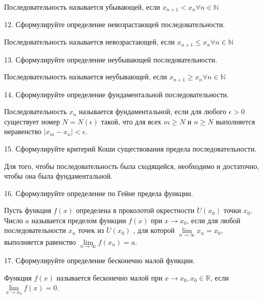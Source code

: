 \documentclass[a4paper, 10pt]{article}
\begin{document}
    Последовательность называется убывающей, если $x_{n+1} < x_n \forall n \in \mathbb{N}$
        
    \begin{bf}12. Сформулируйте определение невозрастающей последовательности.\end{bf}
    
    Последовательность называется невозрастающей, если $x_{n+1} \leqslant x_n \forall n \in \mathbb{N}$
        
    \begin{bf}13. Сформулируйте определение неубывающей последовательности.\end{bf}
    
    Последовательность называется неубывающей, если $x_{n+1} \geqslant x_n \forall n \in \mathbb{N}$
    
    \begin{bf}14. Сформулируйте определение фундаментальной последовательности.\end{bf}
    
    Последовательность ${x_n}$ называется фундаментальной, если для любого $\epsilon > 0$ 
    существует номер $N = N(\epsilon)$ такой, что для всех $m  \geqslant  N$ и $n  \geqslant  N$ выполняется 
    неравенство $| x_m - x_n | < \epsilon$.

    \begin{bf}15. Сформулируйте критерий Коши существования предела последовательности.\end{bf}

    Для того, чтобы последовательность была сходящейся, необходимо и достаточно, чтобы она была фундаментальной.

    \begin{bf}16. Сформулируйте определение по Гейне предела функции.\end{bf}

    Пусть функция $f(x)$ определена в проколотой окрестности $\mathring U(x_0)$ точки $x_0$. 
    Число $a$ называется пределом функции $f(x)$ при $x \to x_0$, если для любой последовательности 
    ${x_n}$ точек из $\mathring U(x_0)$ , для которой $\lim\limits_{n \to \infty} x_n = x_0$,
    выполняется равенство $\lim\limits_{n \to \infty} f(x_n) = a$.

    \begin{bf}17. Сформулируйте определение бесконечно малой функции.\end{bf}

    Функция $f(x)$ называется бесконечно малой при $x \to x_0, x_0 \in \mathbb{R}$, если 
    $\lim\limits_{x \to x_0} f(x) = 0$.
\end{document}
